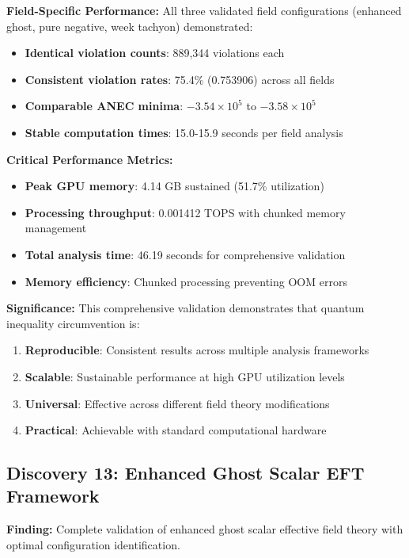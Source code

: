 \documentclass[11pt]{article}
\begin{document}
\textbf{Field-Specific Performance:}
All three validated field configurations (enhanced ghost, pure negative, week tachyon) demonstrated:
\begin{itemize}
    \item \textbf{Identical violation counts}: 889,344 violations each
    \item \textbf{Consistent violation rates}: 75.4\% (0.753906) across all fields
    \item \textbf{Comparable ANEC minima}: $-3.54 \times 10^5$ to $-3.58 \times 10^5$
    \item \textbf{Stable computation times}: 15.0-15.9 seconds per field analysis
\end{itemize}

\textbf{Critical Performance Metrics:}
\begin{itemize}
    \item \textbf{Peak GPU memory}: 4.14 GB sustained (51.7\% utilization)
    \item \textbf{Processing throughput}: 0.001412 TOPS with chunked memory management
    \item \textbf{Total analysis time}: 46.19 seconds for comprehensive validation
    \item \textbf{Memory efficiency}: Chunked processing preventing OOM errors
\end{itemize}

\textbf{Significance:} This comprehensive validation demonstrates that quantum inequality circumvention is:
\begin{enumerate}
    \item \textbf{Reproducible}: Consistent results across multiple analysis frameworks
    \item \textbf{Scalable}: Sustainable performance at high GPU utilization levels
    \item \textbf{Universal}: Effective across different field theory modifications
    \item \textbf{Practical}: Achievable with standard computational hardware
\end{enumerate}

\subsection{Discovery 13: Enhanced Ghost Scalar EFT Framework}

\textbf{Finding:} Complete validation of enhanced ghost scalar effective field theory with optimal configuration identification.
\end{document}
